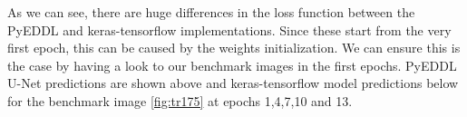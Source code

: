 \begin{figure}[!htb]
    \hfill

    \hfill
\end{figure}

As we can see, there are huge differences in the loss function between the PyEDDL and keras-tensorflow implementations. Since these start from the very first epoch, this can be caused by the weights initialization. We can ensure this is the case by having a look to our benchmark images in the first epochs. PyEDDL U-Net predictions are shown above and keras-tensorflow model predictions below  for the benchmark image \ref{fig:tr175} at epochs 1,4,7,10 and 13. 

